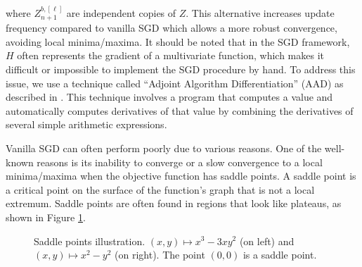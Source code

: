\documentclass{article}
\newcommand{\q}[1]{``#1''}
\renewcommand{\q}[1]{``#1''}
\numberwithin{equation}{section}
\begin{document}
\noindent
where $Z_{n+1}^{b, [\ell]}$ are independent copies of $Z$. This alternative increases update frequency compared to vanilla SGD which allows a more robust convergence, avoiding local minima/maxima. It should be noted that in the SGD framework, $H$ often represents the gradient of a multivariate function, which makes it difficult or impossible to implement the SGD procedure by hand. To address this issue, we use a technique called \q{Adjoint Algorithm Differentiation} (AAD) as described in \cite{Baydin2017AutomaticDI, Paszke2017AutomaticDI}. This technique involves a program that computes a value and automatically computes derivatives of that value by combining the derivatives of several simple arithmetic expressions.




Vanilla SGD can often perform poorly due to various reasons. One of the well-known reasons is its inability to converge or a slow convergence to a local minima/maxima when the objective function has saddle points. A saddle point is a critical point on the surface of the function's graph that is not a local extremum. Saddle points are often found in regions that look like plateaus, as shown in Figure \ref{saddle_pts}.



\begin{figure}[ht]
\hskip 80pt

\caption{Saddle points illustration. $(x, y) \mapsto x^3 - 3xy^2$ (on left) and $(x, y) \mapsto x^2 - y^2$ (on right). The point $(0,0)$ is a saddle point.}
\label{saddle_pts}
\end{figure}
\end{document}
